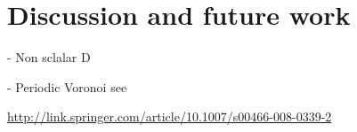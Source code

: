 \documentclass[discussion.tex]{subfiles}
\begin{document}
\chapter{Discussion and future work}

- Non sclalar D

- Periodic Voronoi see

 \url{http://link.springer.com/article/10.1007/s00466-008-0339-2}
 
\end{document}

